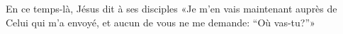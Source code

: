 En ce temps-là, Jésus dit à ses disciples
	«Je m’en vais maintenant auprès de Celui qui m’a envoyé,
	et aucun de vous ne me demande: “Où vas-tu?”»
